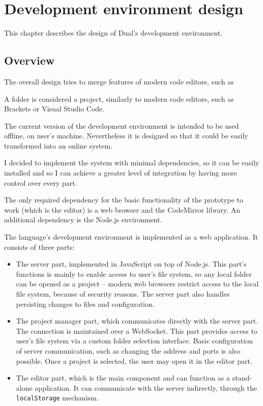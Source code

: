 \chapter{Development environment design}\label{chap:editor}
This chapter describes the design of Dual's development environment.

\section{Overview}
The overall design tries to merge features of modern code editors, such as 

A folder is considered a project, similarly to modern code editors, such as Brackets or Visual Studio Code.

The current version of the development environment is intended to be used
offline, on user's machine. Nevertheless it is designed so that it could be
easily transformed into an online system.

I decided to implement the system with minimal dependencies, so it can be easily
installed and so I can achieve a greater level of integration by having more
control over every part.

The only required dependency for the basic functionality of the prototype to
work (which is the editor) is a web browser and the CodeMirror library. An
additional dependency is the Node.js environment.

The language's development environment is implemented as a web application. It
consists of three parts:
\begin{itemize}
    \item The server part, implemented in JavaScript on top of Node.js. This
      part's functions is mainly to enable access to user's file system, so any
      local folder can be opened as a project -- modern web browsers restrict
      access to the local file system, because of security reasons. The server
      part also handles persisting changes to files and configuration.
    \item The project manager part, which communicates directly with the server
      part. The connection is maintained over a
      WebSocket\cite{mdn_websockets}. This
      part provides access to user's file system via a custom folder selection
      interface. Basic configuration of server communication, such as changing
      the address and ports is also possible. Once a project is selected, the
      user may open it in the editor part.
    \item The editor part, which is the main component and can function as a
      stand-alone application. It can communicate with the server indirectly,
      through the \texttt{localStorage}
      mechanism\cite{mdn_localstorage}.
\end{itemize}

